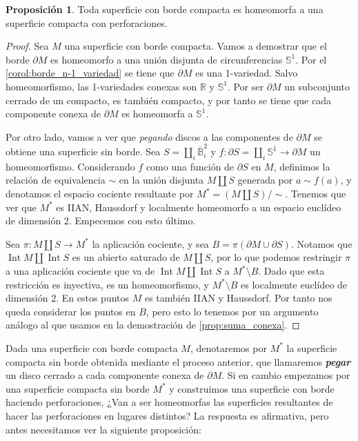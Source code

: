 \documentclass[10pt]{report}
\newcommand{\R}{\mathbb{R}}
\DeclareMathOperator{\interior}{Int} %
\newcommand{\enfatiza}[1]{\textbf{\textit{#1}}}
\theoremstyle{definition}
\newtheorem{prop}[defin]{Proposición}
\begin{document}
\begin{prop}\label{prop:borde_perforaciones}
Toda superficie con borde compacta es homeomorfa a una superficie compacta con perforaciones.
\end{prop}
\begin{proof}
Sea $M$ una superficie con borde compacta. Vamos a demostrar que el borde $\partial M$ es homeomorfo a una unión disjunta de circunferencias $\mathbb{S}^1$. Por el \autoref{corol:borde_n-1_variedad} se tiene que $\partial M$ es una 1-variedad. Salvo homeomorfismo, las 1-variedades conexas son $\R$ y $\mathbb{S}^1$. Por ser $\partial M$ un subconjunto cerrado de un compacto, es también compacto, y por tanto se tiene que cada componente conexa de $\partial M$ es homeomorfa a $\mathbb{S}^1$.

Por otro lado, vamos a ver que \textit{pegando} discos a las componentes de $\partial M$ se obtiene una superficie sin borde. Sea $S=\amalg_i \overline{\mathbb{B}}_i^2$ y $f:\partial S=\amalg_i \mathbb{S}^1\to \partial M$ un homeomorfismo. Considerando $f$ como una función de $\partial S$ en $M$, definimos la relación de equivalencia $\sim$ en la unión disjunta $M\amalg S$ generada por $a\sim f(a)$, y denotamos el espacio cociente resultante por $M^*=(M\amalg S)/\sim$. Tenemos que ver que $M^*$ es IIAN, Haussdorf y localmente homeomorfo a un espacio euclídeo de dimensión $2$. Empecemos con esto último. 

Sea $\pi :M\amalg S\to M^*$ la aplicación cociente, y sea $B=\pi (\partial M\cup \partial S)$. Notamos que $\interior M\amalg \interior S$ es un abierto saturado de $M\amalg S$, por lo que podemos restringir $\pi$ a una aplicación cociente que va de $\interior M\amalg \interior S$ a $M^*\setminus B$. Dado que esta restricción es inyectiva, es un homeomorfismo, y $M^*\setminus B$ es localmente euclídeo de dimensión $2$. En estos puntos $M$ es también IIAN y Haussdorf. Por tanto nos queda considerar los puntos en $B$, pero esto lo tenemos por un argumento análogo al que usamos en la demostración de \autoref{prop:suma_conexa}. 

\end{proof}

Dada una superficie con borde compacta $M$, denotaremos por $M^*$ la superficie compacta sin borde obtenida mediante el proceso anterior, que llamaremos \enfatiza{pegar} un disco cerrado a cada componente conexa de $\partial M$. Si en cambio empezamos por una superficie compacta sin borde $M^*$ y construimos una superficie con borde haciendo perforaciones, ¿Van a ser homeomorfas las superficies resultantes de hacer las perforaciones en lugares distintos? La respuesta es afirmativa, pero antes necesitamos ver la siguiente proposición:
\end{document}
